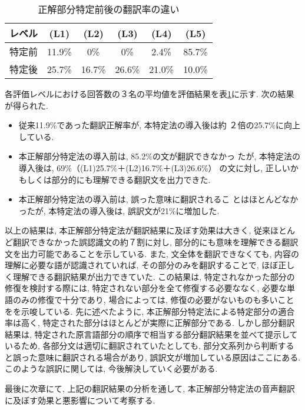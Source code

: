 \begin{table}
\caption{正解部分特定前後の翻訳率の違い}
 \label{tab:eval_trans}
 \center
 \begin{tabular}{|c||c|c|c|c|c|}
\hline
レベル       & (L1)   & (L2)   & (L3)   & (L4)   & (L5)  \\ \hline \hline
特定前       & 11.9\%  & 0\%    & 0\%    & 2.4\%  & 85.7\%   \\ \hline
特定後       & 25.7\%  & 16.7\% & 26.6\% & 21.0\% & 10.0\% \\
\hline
 \end{tabular}
\end{table}

各評価レベルにおける回答数の３名の平均値を評価結果を表\ref{tab:eval_trans}に示す. 次の結果が得られた. 
\begin{itemize}
\item [　結果3-1：] 従来11.9\%であった翻訳正解率が, 本特定法の導入後は約
      ２倍の25.7\%に向上している. 
\item [　結果3-2：] 本正解部分特定法の導入前は, 85.2\%の文が翻訳できなかっ
      たが, 本特定法の導入後は, 69\%（(L1)25.7\%＋(L2)16.7\%＋(L3)26.6\%）
      の文に対し, 正しいかもしくは部分的にも理解できる翻訳文を出力できた. 
\item [　結果3-3：] 本正解部分特定法の導入前は, 誤った意味に翻訳されるこ
      とはほとんどなかったが, 本特定法の導入後は, 誤訳文が21\%に増加した. 
\end{itemize}
以上の結果は, 本正解部分特定法が翻訳結果に及ぼす効果は大きく, 従来ほとんど翻訳できなかった誤認識文の約７割に対し, 部分的にも意味を理解できる翻訳文を出力可能であることを示している. 
また, 文全体を翻訳できなくても, 内容の理解に必要な語が認識されていれば, その部分のみを翻訳することで, ほぼ正しく理解できる翻訳結果が出力できていた. 
この結果は, 特定されなかった部分の修復を検討する際には, 特定されない部分を全て修復する必要ななく, 必要な単語のみの修復で十分であり, 場合によっては, 修復の必要がないものも多いことをを示唆している. 
先に述べたように, 本正解部分特定法による特定部分の適合率は高く, 特定された部分はほとんどが実際に正解部分である. 
しかし部分翻訳結果は, 特定された原言語部分の順序で相当する部分翻訳結果を並べて提示しているため, 各部分文は適切に翻訳されていたとしても, 部分文系列から判断すると誤った意味に翻訳される場合があり, 誤訳文が増加している原因はここにある. 
このような誤訳に関しては, 今後解決していく必要がある. 

最後に次章にて, 上記の翻訳結果の分析を通して, 本正解部分特定法の音声翻訳に及ぼす効果と悪影響について考察する. 

